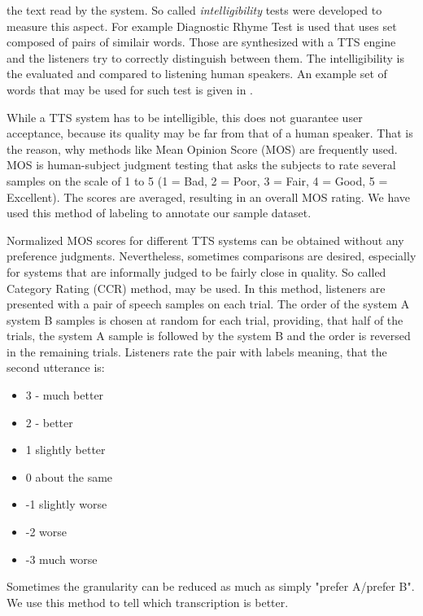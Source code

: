the text read by the system. So called \textit{intelligibility} tests were developed to measure this aspect.
For example Diagnostic Rhyme Test is used that uses set composed of pairs of similair words.
Those are synthesized with a TTS engine and the listeners try to correctly distinguish between them.
The intelligibility is the evaluated and compared to listening human speakers.
An example set of words that may be used for such test is given in .
\par
While a TTS system has to be intelligible, this does not guarantee user acceptance, because
its quality may be far from that of a human speaker.
That is the reason, why methods like Mean Opinion Score (MOS) are frequently used.
MOS is human-subject judgment testing that asks the subjects to rate several samples on the scale of 1 to 5 (1 = Bad, 2 = Poor, 3 = Fair, 4 = Good, 5 = Excellent).
The scores are averaged, resulting in an overall MOS rating.
We have used this method of labeling to annotate our sample dataset.
\par
Normalized MOS scores for different TTS systems can be obtained without any preference judgments.
Nevertheless, sometimes comparisons are desired, especially for systems that are informally judged to be fairly close in quality.
So called Category Rating (CCR) method, may be used.
In this method, listeners are presented with a pair of speech samples on each trial. The order of the system A system B samples is chosen at random for each trial, providing, that half of the trials, the system A sample is followed by the system B and the order is reversed in the remaining trials.
Listeners rate the pair with labels meaning, that the second utterance is:
\begin{itemize}
\item 3 - much better
\item 2 - better
\item 1 slightly better
\item 0 about the same
\item -1 slightly worse
\item -2 worse
\item -3 much worse
\end{itemize}
Sometimes the granularity can be reduced as much as simply "prefer A/prefer B".
We use this method to tell which transcription is better.